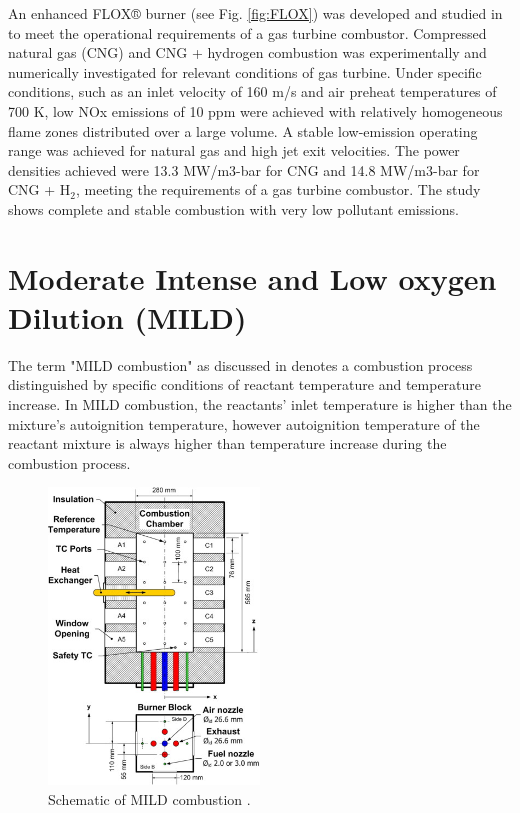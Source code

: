 An enhanced FLOX® burner (see Fig. \ref{fig:FLOX}) was developed and studied in \cite{LAMMEL4001825} to meet the operational requirements of a gas turbine combustor. Compressed natural gas (CNG) and CNG + hydrogen combustion was experimentally and numerically investigated for relevant conditions of gas turbine. Under specific conditions, such as an inlet velocity of 160 m/s and air preheat temperatures of 700 K, low NOx emissions of 10 ppm were achieved with relatively homogeneous flame zones distributed over a large volume. A stable low-emission operating range was achieved for natural gas and high jet exit velocities.  The power densities achieved were 13.3 MW/m3-bar for CNG and 14.8 MW/m3-bar for CNG + H$_2$, meeting the requirements of a gas turbine combustor. The study shows complete and stable combustion with very low pollutant emissions.

\section{Moderate Intense and Low oxygen Dilution (MILD)}

The term "MILD combustion" as discussed in \cite{CAVALIERE2004329} denotes a combustion process distinguished by specific conditions of reactant temperature and temperature increase. In MILD combustion, the reactants' inlet temperature is higher than the mixture's autoignition temperature, however autoignition temperature of the reactant mixture is always higher than temperature increase during the combustion process.

\begin{figure}
    \centering
    \includegraphics[width=0.5\textwidth]{Chapter2/Images/MILD.jpg}
    \caption[Schematic of MILD combustion]{Schematic of MILD combustion \cite{SZEGO2009429}.}
    \label{fig:MILD}
\end{figure}

